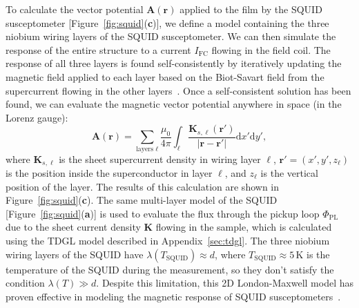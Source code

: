 \documentclass[%
 reprint,
 superscriptaddress,
 amsmath,
 amssymb,
 amsfonts,
 aps,
 prb,
]{revtex4-2}
\newcommand{\FC}{\mathrm{FC}}
\newcommand{\PL}{\mathrm{PL}}
\begin{document}

To calculate the vector potential $\mathbf{A}(\mathbf{r})$ applied to the film by the SQUID susceptometer [Figure~\ref{fig:squid}({\bf c})], we define a model containing the three niobium wiring layers of the SQUID susceptometer. We can then simulate the response of the entire structure to a current $I_\FC$ flowing in the field coil. The response of all three layers is found self-consistently by iteratively updating the magnetic field applied to each layer based on the Biot-Savart field from the supercurrent flowing in the other layers~\cite{Bishop-Van_Horn2022-sy,Kirtley2016-gt}. Once a self-consistent solution has been found, we can evaluate the magnetic vector potential anywhere in space (in the Lorenz gauge):
\begin{equation}
    \label{eq:A-lorenz}
    \mathbf{A}(\mathbf{r})=\sum_{\text{layers }\ell}\frac{\mu_0}{4\pi}\int_{\ell}\frac{\mathbf{K}_{s,\ell}(\mathbf{r}')}{|\mathbf{r}-\mathbf{r}'|}\mathrm{d}x'\mathrm{d}y',
\end{equation}
where $\mathbf{K}_{s,\ell}$ is the sheet supercurrent density in wiring layer $\ell$, $\mathbf{r}'=(x', y', z_\ell)$ is the position inside the superconductor in layer $\ell$, and $z_\ell$ is the vertical position of the layer. The results of this calculation are shown in Figure~\ref{fig:squid}({\bf c}). The same multi-layer model of the SQUID [Figure~\ref{fig:squid}({\bf a})] is used to evaluate the flux through the pickup loop $\Phi_\PL$ due to the sheet current density $\mathbf{K}$ flowing in the sample, which is calculated using the TDGL model described in Appendix~\ref{sec:tdgl}. The three niobium wiring layers of the SQUID have $\lambda(T_\mathrm{SQUID})\approx d$, where $T_\mathrm{SQUID}\approx 5\,\mathrm{K}$ is the temperature of the SQUID during the measurement, so they don't satisfy the condition $\lambda(T) \gg d$. Despite this limitation, this 2D London-Maxwell model has proven effective in modeling the magnetic response of SQUID susceptometers~\cite{Kirtley2016-gt, Kirtley2016-zz, Bishop-Van_Horn2022-sy}.
\end{document}
